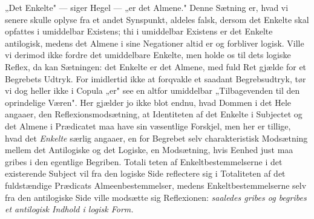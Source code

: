 \documentclass[12pt]{book}
\newcommand{\opage}[1]{\marginnote{\footnotesize\textit{[#1]}}}
\begin{document}
„Det Enkelte" --- siger Hegel --- „er det Almene." Denne Sætning er, hvad vi senere skulle
oplyse fra et andet Synspunkt, aldeles falsk, dersom det Enkelte skal opfattes i umiddelbar
Existens; thi i umiddelbar Existens er det Enkelte antilogisk, medens det Almene i sine
Negationer altid er og forbliver logisk. Ville vi derimod ikke fordre det umiddelbare Enkelte,
men holde os til dets logiske Reflex, da kan Sætningen: det Enkelte er det Almene, med fuld
Ret gjælde for et Begrebets Udtryk. For imidlertid ikke at forqvakle et saadant
Begrebsudtryk, tør vi dog heller ikke i Copula „er" see en altfor umiddelbar „Tilbagevenden
til den oprindelige Væren". Her gjælder jo ikke blot endnu, hvad Dommen i det Hele angaaer,
den Reflexionsmodsætning, at Identiteten af det Enkelte i Subjectet og det Almene i Prædicatet
maa have sin væsentlige Forskjel, men her er tillige, hvad det \emph{Enkelte} særlig angaaer,
en for Begrebet selv charakteristisk Modsætning mellem det Antilogiske og det Logiske, en
Modsætning, hvis Eenhed just maa gribes i den egentlige Begriben. Totali%
\opage{154} teten af Enkeltbestemmelserne i det existerende Subject vil fra den logiske Side reflectere
sig i Totaliteten af det fuldstændige Prædicats Almeenbestemmelser, medens
Enkeltbestemmelserne selv fra den antilogiske Side ville modsætte sig Reflexionen:
\emph{saaledes gribes og begribes et antilogisk Indhold i logisk Form.}
\end{document}

